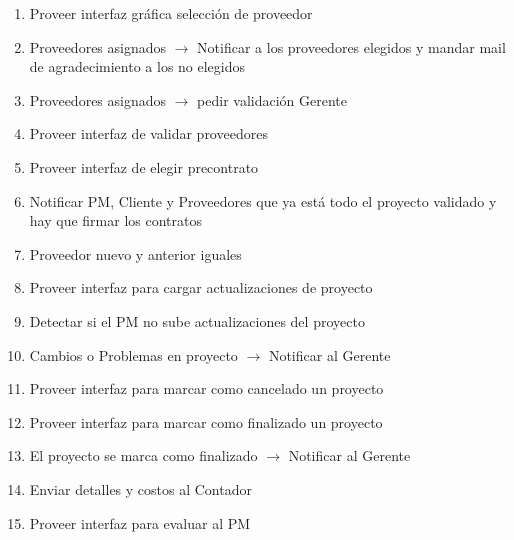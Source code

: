 \begin{enumerate}
	\item Proveer interfaz gráfica selección de proveedor
	\item Proveedores asignados $\rightarrow$ Notificar a los proveedores elegidos y mandar mail de agradecimiento a los no elegidos
	\item Proveedores asignados $\rightarrow$ pedir validación Gerente
	\item Proveer interfaz de validar proveedores
	\item Proveer interfaz de elegir precontrato
	\item Notificar PM, Cliente y Proveedores que ya está todo el proyecto validado y hay que firmar los contratos
	
	\item Proveedor nuevo y anterior iguales
	\item Proveer interfaz para cargar actualizaciones de proyecto
	\item Detectar si el PM no sube actualizaciones del proyecto
	\item Cambios o Problemas en proyecto $\rightarrow$ Notificar al Gerente
	\item Proveer interfaz para marcar como cancelado un proyecto
	
	
	\item Proveer interfaz para marcar como finalizado un proyecto
	\item El proyecto se marca como finalizado $\rightarrow$ Notificar al Gerente
	\item Enviar detalles y costos al Contador
	\item Proveer interfaz para evaluar al PM
	
	
\end{enumerate}
